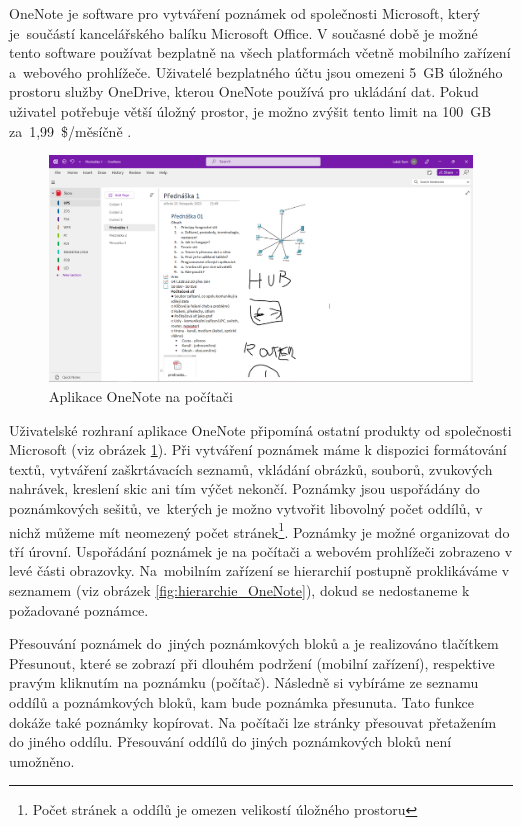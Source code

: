 \documentclass[czech, bc, kiv, he, iso690numb]{fasthesis}
\begin{document}
OneNote je software pro vytváření poznámek od společnosti Microsoft, který je~součástí kancelářského balíku Microsoft Office. V současné době je možné tento software používat bezplatně na všech platformách včetně mobilního zařízení a~webového prohlížeče. Uživatelé bezplatného účtu jsou omezeni 5~GB úložného prostoru služby OneDrive, kterou OneNote používá pro ukládání dat. Pokud uživatel potřebuje větší úložný prostor, je možno zvýšit tento limit na 100~GB za~1,99~\$/měsíčně \cite{OneNote-help}.
 

\begin{figure}[h!]
  \centering
  \includegraphics[width=1\textwidth]{img/BP-Runt/OneNote/OneNote_PC.png}
  \caption{Aplikace OneNote na počítači}
  \label{fig:OneNoteOnPc}
\end{figure}

Uživatelské rozhraní aplikace OneNote připomíná ostatní produkty od společnosti Microsoft (viz obrázek \ref{fig:OneNoteOnPc}). Při vytváření poznámek máme k dispozici formátování textů, vytváření zaškrtávacích seznamů, vkládání obrázků, souborů, zvukových nahrávek, kreslení skic ani tím výčet nekončí. Poznámky jsou uspořádány do poznámkových sešitů, ve~kterých je možno vytvořit libovolný počet oddílů, v nichž můžeme mít neomezený počet stránek\footnote{Počet stránek a oddílů je omezen velikostí úložného prostoru}. Poznámky je možné organizovat do tří úrovní. Uspořádání poznámek je na počítači a webovém prohlížeči zobrazeno v levé části obrazovky. Na~mobilním zařízení se hierarchií postupně proklikáváme v seznamem (viz obrázek \ref{fig:hierarchie_OneNote}), dokud se nedostaneme k požadované poznámce.

Přesouvání poznámek do~jiných poznámkových bloků a je realizováno tlačítkem Přesunout, které se zobrazí při dlouhém podržení (mobilní zařízení), respektive pravým kliknutím na poznámku (počítač). Následně si vybíráme ze seznamu oddílů a poznámkových bloků, kam bude poznámka přesunuta. Tato funkce dokáže také poznámky kopírovat. Na počítači lze stránky přesouvat přetažením do jiného oddílu. Přesouvání oddílů do jiných poznámkových bloků není umožněno.
\end{document}
